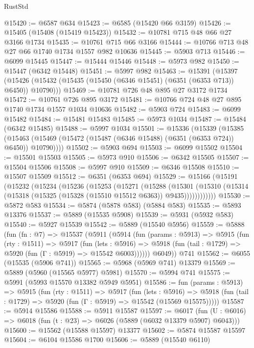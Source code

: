 \begin{lexlean}{RustStd}
\begin{coremodule}
@15420 := @6587 @634
@15423 := @6585 (@15420 @66 @3159)
@15426 := @15405 (@15408 (@15419 @15423))
@15432 := @10781 @715 @48 @66 @27 @3166 @1734
@15435 := @10761 @715 @66 @3166
@15444 := @10766 @713 @48 @27 @66 @1740 @1734 @1557 @982 @10636
@15445 := @5903 @713
@15446 := @6099 @15445
@15447 := @15444 @15446
@15448 := @5973 @982
@15450 := @15447 (@6342 @15448)
@15451 := @5997 @982
@15463 := @15391
    (@15397 (@15426 (@15432 (@15435 (@15450 (@6346 @15451) (@6351 (@6353 @713)) @6450)) @10790)))
@15469 := @10781 @726 @48 @895 @27 @3172 @1734
@15472 := @10761 @726 @895 @3172
@15481 := @10766 @724 @48 @27 @895 @1740 @1734 @1557 @1034 @10636
@15482 := @5903 @724
@15483 := @6099 @15482
@15484 := @15481 @15483
@15485 := @5973 @1034
@15487 := @15484 (@6342 @15485)
@15488 := @5997 @1034
@15501 := @15336
    (@15339
      (@15385 (@15463 (@15469 (@15472 (@15487 (@6346 @15488) (@6351 (@6353 @724)) @6450)) @10790))))
@15502 := @5903 @694
@15503 := @6099 @15502
@15504 := @15501 @15503
@15505 := @5973 @910
@15506 := @6342 @15505
@15507 := @15504 @15506
@15508 := @5997 @910
@15509 := @6346 @15508
@15510 := @15507 @15509
@15512 := @6351 (@6353 @694)
@15529 := @15166
    (@15191
      (@15232
        (@15234
          (@15236
            (@15253
              (@15271
                (@15288
                  (@15301
                    (@15310 (@15314 (@15318 (@15325 (@15328 (@15510 @15512 @6363)) @9435))))))))))))
@15530 := @5872 @583
@15534 := @5874 (@5878 @583) (@5884 @583)
@15535 := @5893 @13376
@15537 := @5889 (@15535 @5908)
@15539 := @5931 (@5932 @583)
@15540 := @5927 @15539
@15542 := @5889 (@15540 @5956)
@15559 := @5888
    (fun (fn : @7) =>
    @15537
      (@5911
        (@5914
          (fun (params : @5913) =>
          @5915
            (fun (rty : @1511) =>
            @5917
              (fun (lets : @5916) =>
              @5918 (fun (tail : @1729) => @5920 (fun (Γ : @5919) => @15542 @6003))))))
        @6049))
    @741
@15562 := @6055 (@15535 (@5906 @741))
@15565 := @5968 (@5969 @741) @13379
@15569 := @5889 (@5960 (@15565 @5977) @5981)
@15570 := @5994 @741
@15575 := @5991 (@5993 @15570 @13382 @5949 @5951)
@15586 := fun (params : @5913) =>
  @5915
    (fun (rty : @1511) =>
    @5917
      (fun (lets : @5916) =>
      @5918 (fun (tail : @1729) => @5920 (fun (Γ : @5919) => @15542 (@15569 @15575)))))
@15587 := @5914 @15586
@15588 := @5911 @15587
@15597 := @6017
    (fun (U : @6016) => @6018 (fun (t : @23) => @6026 (@5889 (@6032 @13379 @5907) @6043)))
@15600 := @15562 (@15588 @15597) @13377
@15602 := @5874 @15587 @15597
@15604 := @6104 @15586 @1700
@15606 := @5889 (@15540 @6110)

\end{coremodule}
\end{lexlean}
